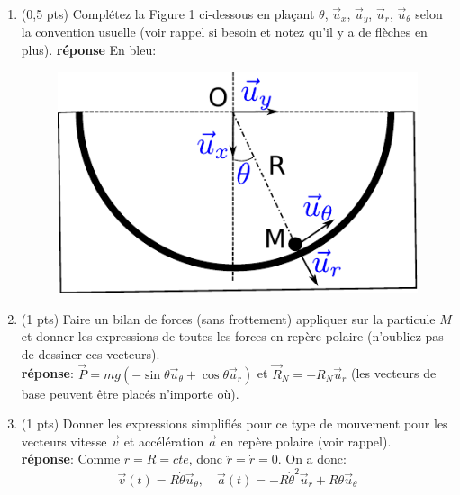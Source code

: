 \documentclass[french,10pt]{article}
\begin{document}
	\begin{enumerate}
	\item(0,5 pts) Complétez la Figure 1 ci-dessous en plaçant $\theta$, $\Vec{u}_x$, $\Vec{u}_y$, $\Vec{u}_r$, $\Vec{u}_\theta$ selon la convention usuelle (voir rappel si besoin et notez qu'il y a de flèches en plus).
	\textbf{réponse} En bleu:
	\begin{figure}
		\centering
		\includegraphics[width=0.5\linewidth]{halfpipe}
		\caption{}
		\label{fig:halfpipe}
	\end{figure}

 	\FloatBarrier
	
	
	\item (1 pts) Faire un bilan de forces (sans frottement) appliquer sur la particule $M$ et donner les expressions de toutes les forces en repère polaire (n'oubliez pas de dessiner ces vecteurs). \\
	\textbf{réponse}: $\boxed{\vec{P} = mg( -\sin \theta \vec{u}_{\theta} + \cos \theta \vec{u}_r)}$ et $\boxed{\vec{R}_N = -R_N\vec{u}_r}$ (les vecteurs de base peuvent être placés n'importe où).
	\begin{center}
	\end{center}
	\item (1 pts) Donner les expressions simplifiés pour ce type de mouvement pour les vecteurs vitesse $\Vec{v}$ et accélération $\Vec{a}$ en repère polaire (voir rappel). \\
	\textbf{réponse}: Comme $r = R = cte$, donc $\ddot{r} = \dot{r} = 0$. On a donc:
	$$\boxed{\Vec{v}(t) = R \dot{\theta} \Vec{u}_{\theta}, \quad
	\Vec{a}(t) = - R\dot{\theta}^2 \Vec{u}_r + R \ddot{\theta} \Vec{u}_{\theta}}$$
	



\end{enumerate}
\end{document}
